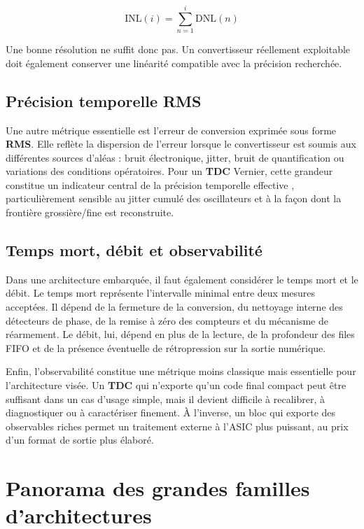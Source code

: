 \begin{equation}
    \mathrm{INL}(i)=\sum_{n=1}^{i}\mathrm{DNL}(n)
\end{equation}

Une bonne résolution ne suffit donc pas. Un convertisseur réellement exploitable doit également conserver une linéarité compatible avec la précision recherchée.

\subsection{Précision temporelle RMS}

Une autre métrique essentielle est l'erreur de conversion exprimée sous forme \textbf{RMS}. Elle reflète la dispersion de l'erreur lorsque le convertisseur est soumis aux différentes sources d'aléas : bruit électronique, jitter, bruit de quantification ou variations des conditions opératoires. Pour un \textbf{TDC} Vernier, cette grandeur constitue un indicateur central de la précision temporelle effective \cite{annagrebah2021thesis}, particulièrement sensible au jitter cumulé des oscillateurs et à la façon dont la frontière grossière/fine est reconstruite.

\subsection{Temps mort, débit et observabilité}

Dans une architecture embarquée, il faut également considérer le temps mort et le débit. Le temps mort représente l'intervalle minimal entre deux mesures acceptées. Il dépend de la fermeture de la conversion, du nettoyage interne des détecteurs de phase, de la remise à zéro des compteurs et du mécanisme de réarmement. Le débit, lui, dépend en plus de la lecture, de la profondeur des files FIFO et de la présence éventuelle de rétropression sur la sortie numérique.

Enfin, l'observabilité constitue une métrique moins classique mais essentielle pour l'architecture visée. Un \textbf{TDC} qui n'exporte qu'un code final compact peut être suffisant dans un cas d'usage simple, mais il devient difficile à recalibrer, à diagnostiquer ou à caractériser finement. À l'inverse, un bloc qui exporte des observables riches permet un traitement externe à l'ASIC plus puissant, au prix d'un format de sortie plus élaboré.

\section{Panorama des grandes familles d'architectures}

